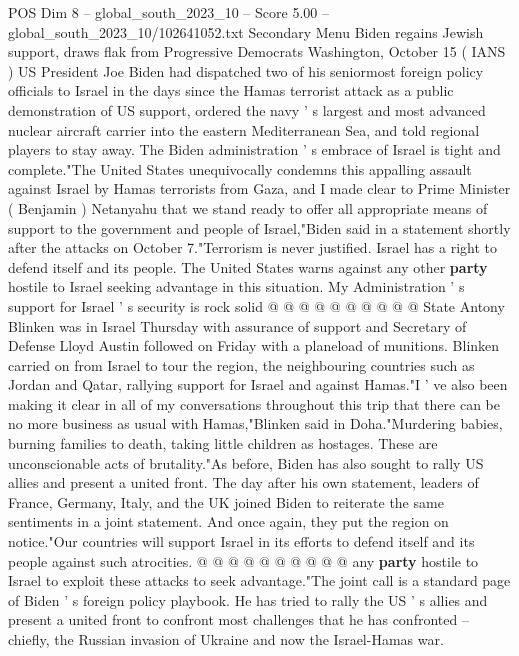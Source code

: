 \begin{textsample}{POS Dim 8 – global\_south\_2023\_10 – Score 5.00 – global\_south\_2023\_10/102641052.txt}  \label{ex:f8_pos_365}
Secondary Menu Biden regains Jewish support, draws flak from Progressive Democrats Washington, October 15 ( IANS ) US President Joe Biden had dispatched two of his seniormost foreign policy officials to Israel in the days since the Hamas terrorist attack as a public demonstration of US support, ordered the navy ' s largest and most advanced nuclear aircraft carrier into the eastern Mediterranean Sea, and told regional players to stay away.
The Biden administration ' s embrace of Israel is tight and complete."The United States unequivocally condemns this appalling assault against Israel by Hamas terrorists from Gaza, and I made clear to Prime Minister ( Benjamin ) Netanyahu that we stand ready to offer all appropriate means of support to the government and people of Israel,"Biden said in a statement shortly after the attacks on October 7."Terrorism is never justified.
Israel has a right to defend itself and its people.
The United States warns against any other \textbf{party} hostile to Israel seeking advantage in this situation.
My Administration ' s support for Israel ' s security is rock solid @ @ @ @ @ @ @ @ @ @ State Antony Blinken was in Israel Thursday with assurance of support and Secretary of Defense Lloyd Austin followed on Friday with a planeload of munitions.
Blinken carried on from Israel to tour the region, the neighbouring countries such as Jordan and Qatar, rallying support for Israel and against Hamas."I ' ve also been making it clear in all of my conversations throughout this trip that there can be no more business as usual with Hamas,"Blinken said in Doha."Murdering babies, burning families to death, taking little children as hostages.
These are unconscionable acts of brutality."As before, Biden has also sought to rally US allies and present a united front.
The day after his own statement, leaders of France, Germany, Italy, and the UK joined Biden to reiterate the same sentiments in a joint statement.
And once again, they put the region on notice."Our countries will support Israel in its efforts to defend itself and its people against such atrocities. @ @ @ @ @ @ @ @ @ @ any \textbf{party} hostile to Israel to exploit these attacks to seek advantage."The joint call is a standard page of Biden ' s foreign policy playbook.
He has tried to rally the US ' s allies and present a united front to confront most challenges that he has confronted -- chiefly, the Russian invasion of Ukraine and now the Israel-Hamas war.

\end{textsample}
